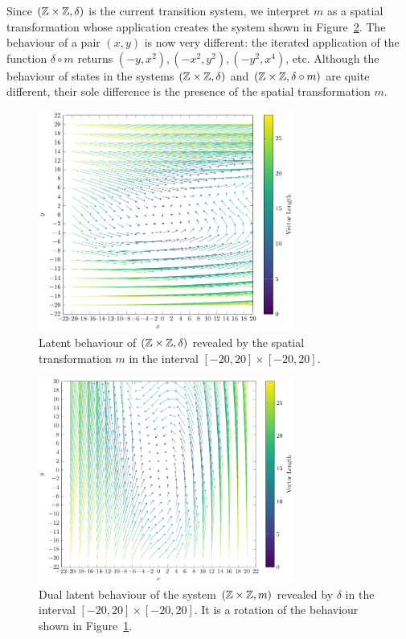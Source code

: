 Since $(\mathbb{Z}\times\mathbb{Z}, \delta)$ is the current transition system, we interpret $m$ as a spatial transformation whose application creates the system shown in Figure~\ref{fig:SecondLatent}. %
The behaviour of a pair $(x,y)$ is now very different: the iterated application of the function $\delta\circ m$ returns $(-y,x^2),(-x^2,y^2),(-y^2,x^4)$, etc. Although the behaviour of states in the systems $(\mathbb{Z}\times\mathbb{Z}, \delta)$ and $(\mathbb{Z}\times\mathbb{Z}, \delta\circ m)$ are quite different, their sole difference is the presence of the spatial transformation $m$. 
\begin{figure}[!t]
  \centering
  \includegraphics[width=0.75\textwidth]{Figures/VectorSpace4.pdf} 
  \caption{Latent behaviour of $(\mathbb{Z}\times\mathbb{Z}, \delta)$ revealed by the spatial transformation $m$ in the interval $[-20,20]\times[-20,20]$.}
  \label{fig:FirstLatent}
\end{figure} 
\begin{figure}[!t]
  \centering
  \includegraphics[width=0.75\textwidth]{Figures/VectorSpace3.pdf} 
  \caption{Dual latent behaviour of the system $(\mathbb{Z}\times\mathbb{Z}, m)$ revealed by $\delta$ in the interval $[-20,20]\times[-20,20]$. It is a rotation of the behaviour shown in Figure~\ref{fig:FirstLatent}.}
  \label{fig:SecondLatent} 
\end{figure}

